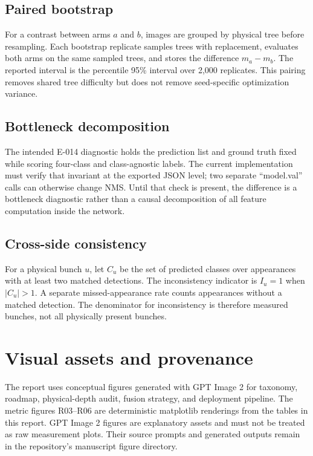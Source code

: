 \subsection{Paired bootstrap}
For a contrast between arms \(a\) and \(b\), images are grouped by physical
tree before resampling. Each bootstrap replicate samples trees with
replacement, evaluates both arms on the same sampled trees, and stores the
difference \(m_a-m_b\). The reported interval is the percentile 95\% interval
over 2,000 replicates. This pairing removes shared tree difficulty but does
not remove seed-specific optimization variance.

\subsection{Bottleneck decomposition}
The intended E-014 diagnostic holds the prediction list and ground truth fixed
while scoring four-class and class-agnostic labels. The current implementation
must verify that invariant at the exported JSON level; two separate
``model.val'' calls can otherwise change NMS. Until that check is present, the
difference is a bottleneck diagnostic rather than a causal decomposition of
all feature computation inside the network.

\subsection{Cross-side consistency}
For a physical bunch \(u\), let \(C_u\) be the set of predicted classes over
appearances with at least two matched detections. The inconsistency indicator
is \(I_u=1\) when \(|C_u|>1\). A separate missed-appearance rate counts
appearances without a matched detection. The denominator for inconsistency is
therefore measured bunches, not all physically present bunches.

\section{Visual assets and provenance}
\label{app:assets}
The report uses conceptual figures generated with GPT Image 2 for taxonomy,
roadmap, physical-depth audit, fusion strategy, and deployment pipeline. The
metric figures R03--R06 are deterministic matplotlib renderings from the
tables in this report. GPT Image 2 figures are explanatory assets and must not
be treated as raw measurement plots. Their source prompts and generated
outputs remain in the repository's manuscript figure directory.

